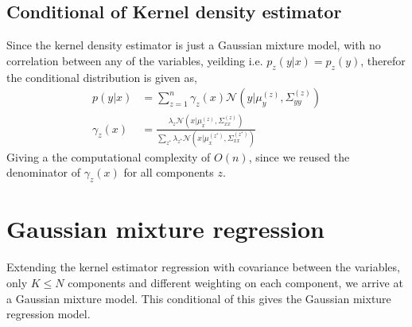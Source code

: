     

\subsection{Conditional of Kernel density estimator}
Since the kernel density estimator is just a Gaussian mixture model, with no correlation between
any of the variables, yeilding i.e. $p_z(y|x) = p_z(y)$, therefor the conditional distribution is
given as, 
\begin{align}
    p(y|x) &= \sum_{z=1}^n \gamma_z(x) \mathcal{N}(y|\mu_{y}^{(z)},\Sigma_{yy}^{(z)} )\\
    \gamma_z(x) &= \frac{\lambda_z \mathcal{N}(x|\mu_{x}^{(z)},\Sigma_{xx}^{(z)})}{\sum_{z^*}
\lambda_{z^*} \mathcal{N}(x|\mu_{x}^{(z^*)},\Sigma_{xx}^{(z^*)})}
\end{align}
Giving a the computational complexity of $O(n)$, since we reused the denominator of 
$\gamma_z(x)$ for all components $z$. 

\section{Gaussian mixture regression}
Extending the kernel estimator regression with covariance between the variables, only $K \leq N$ components 
and different weighting on each component, we arrive at a Gaussian mixture model. This conditional of this
gives the Gaussian mixture regression model. 

